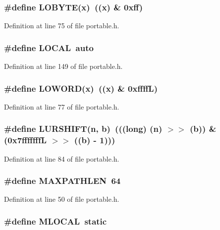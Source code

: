 \subsubsection{\setlength{\rightskip}{0pt plus 5cm}\#define LOBYTE(x)\ ((x) \& 0xff)}\label{portable_8h_a3}




Definition at line 75 of file portable.h.
\subsubsection{\setlength{\rightskip}{0pt plus 5cm}\#define LOCAL\ auto}\label{portable_8h_a54}




Definition at line 149 of file portable.h.
\subsubsection{\setlength{\rightskip}{0pt plus 5cm}\#define LOWORD(x)\ ((x) \& 0xffff\-L)}\label{portable_8h_a5}




Definition at line 77 of file portable.h.
\subsubsection{\setlength{\rightskip}{0pt plus 5cm}\#define LURSHIFT(n, b)\ (((long) (n) $>$$>$ (b)) \& (0x7fffffff\-L $>$$>$ ((b) - 1)))}\label{portable_8h_a10}




Definition at line 84 of file portable.h.
\subsubsection{\setlength{\rightskip}{0pt plus 5cm}\#define MAXPATHLEN\ 64}\label{portable_8h_a0}




Definition at line 50 of file portable.h.
\subsubsection{\setlength{\rightskip}{0pt plus 5cm}\#define MLOCAL\ static}\label{portable_8h_a56}




